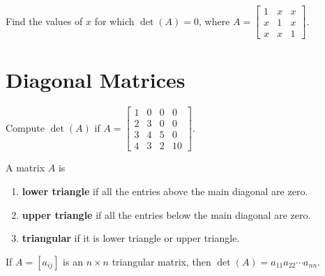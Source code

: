 \documentclass[20pt,a4paper]{extarticle}
\newcounter{example}
\newcounter{theorem}
\newcounter{definition}
\begin{document}
\begin{example}
Find the values of $x$ for which $\det (A) = 0$, where $A = \begin{bmatrix} 1 & x & x \\ x & 1 & x \\ x & x & 1 \end{bmatrix}$.
\end{example}

\begin{solution}

\end{solution}

\newpage 

\section{Diagonal Matrices}

\begin{example}
Compute $\det (A)$ if $A = \begin{bmatrix} 1 & 0 & 0 & 0 \\ 2 & 3 & 0 & 0 \\ 3 & 4 & 5 & 0 \\ 4 & 3 & 2 & 10 \end{bmatrix}$.
\end{example}

\begin{solution}

\end{solution}

\vfill 

\begin{definition}
A matrix $A$ is
	\begin{enumerate}
		\item \textbf{lower triangle} if all the entries above the main diagonal are zero.
		\item \textbf{upper triangle} if all the entries below the main diagonal are zero.
		\item \textbf{triangular} if it is lower triangle or upper triangle.
	\end{enumerate}
\end{definition}

\begin{theorem}
If $A = [a_{ij}]$ is an $n \times n$ triangular matrix, then $\det (A) = a_{11} a_{22} \cdots a_{nn}$.
\end{theorem}
\end{document}
